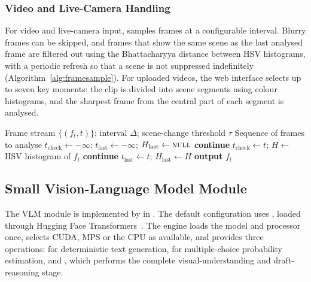 \subsubsection{Video and Live-Camera Handling}
For video and live-camera input,  samples frames at a configurable interval. Blurry frames can be skipped, and frames that show the same scene as the last analysed frame are filtered out using the Bhattacharyya distance between HSV histograms, with a periodic refresh so that a scene is not suppressed indefinitely (Algorithm~\ref{alg:framesample}). For uploaded videos, the web interface selects up to seven key moments: the clip is divided into scene segments using colour histograms, and the sharpest frame from the central part of each segment is analysed.

\begin{algorithm}[H]
\caption{Frame Sampling for Video and Live Camera}
\label{alg:framesample}
\begin{algorithmic}[1]
\Require Frame stream $\{(f_t, t)\}$; interval $\Delta$; scene-change threshold $\tau$
\Ensure Sequence of frames to analyse
\State $t_{\text{check}} \gets -\infty$;\; $t_{\text{last}} \gets -\infty$;\; $H_{\text{last}} \gets \textsc{null}$
    \State \textbf{continue}
  \EndIf
  \State $t_{\text{check}} \gets t$;\; $H \gets$ HSV histogram of $f_t$
    \State \textbf{continue} 
  \EndIf
  \State $t_{\text{last}} \gets t$;\; $H_{\text{last}} \gets H$
  \State \textbf{output} $f_t$
\EndFor
\end{algorithmic}
\end{algorithm}

\subsection{Small Vision-Language Model Module}
\label{sec:vlm}

The VLM module is implemented by  in . The default configuration uses , loaded through Hugging Face Transformers~\cite{wolf2020transformers}. The engine loads the model and processor once, selects CUDA, MPS or the CPU as available, and provides three operations:  for deterministic text generation,  for multiple-choice probability estimation, and , which performs the complete visual-understanding and draft-reasoning stage.

